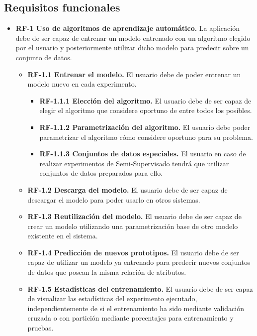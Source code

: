 \subsection{Requisitos funcionales}\label{requisitos-funcionales}
\begin{itemize}
\tightlist
\item
  \textbf{RF-1 Uso de algoritmos de aprendizaje automático.} La aplicación debe de ser capaz de entrenar un modelo entrenado con un algoritmo elegido por el usuario y posteriormente utilizar dicho modelo para predecir sobre un conjunto de datos.

\begin{itemize}
\tightlist
\item \textbf{RF-1.1 Entrenar el modelo.} El usuario debe de poder entrenar un modelo nuevo en cada experimento.
    \begin{itemize}
    \tightlist
    \item \textbf{RF-1.1.1 Elección del algoritmo.} El usuario debe de ser capaz de elegir el algoritmo que considere oportuno de entre todos los posibles.
     \item \textbf{RF-1.1.2 Parametrización del algoritmo.} El usuario debe poder parametrizar el algoritmo cómo considere oportuno para su problema.
     \item \textbf{RF-1.1.3 Conjuntos de datos especiales.} El usuario en caso de realizar experimentos de Semi-Supervisado tendrá que utilizar conjuntos de datos preparados para ello.
    \end{itemize}
    \item \textbf{RF-1.2 Descarga del modelo.} El usuario debe de ser capaz de descargar el modelo para poder usarlo en otros sistemas.
    \item \textbf{RF-1.3 Reutilización del modelo.} El usuario debe de ser capaz de crear un modelo  utilizando una parametrización base de otro modelo existente en el sistema.
    \item \textbf{RF-1.4 Predicción de nuevos prototipos.} El usuario debe de ser capaz de utilizar un modelo ya entrenado para predecir nuevos conjuntos de datos que posean la misma relación de atributos.
    \item \textbf{RF-1.5 Estadísticas del entrenamiento.} El usuario debe de ser capaz de visualizar las estadísticas del experimento ejecutado, independientemente de si el entrenamiento ha sido mediante validación cruzada o con partición mediante porcentajes para entrenamiento y pruebas.
  \end{itemize}

\end{itemize}
